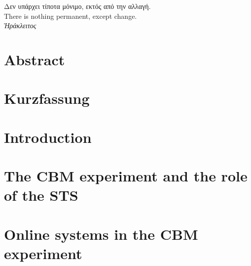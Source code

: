 \newcommand{\myNumberStyle}[1]{{\footnotesize\sffamily\color{brown!100!black} #1}}











\thispagestyle{empty}
\begin{center}

\hspace{0pt}
\vfill

\Large\foreignlanguage{greek}{Δεν υπάρχει τίποτα μόνιμο, εκτός από την αλλαγή.\\}
\vspace{0.5cm}
\normalsize{There is nothing permanent, except change.\\}
\vspace{1cm}
\color{auburn}\foreignlanguage{greek}{\textit{Ἡράκλειτος}}
\vfill
\hspace{0pt}
\end{center}
\chapter*{Abstract}
\chapter*{Kurzfassung}
%
\chapter{Introduction}
\label{chap:intro}

\chapter{The CBM experiment and the role of the STS}
\label{chap:CBM_STS}



\chapter{Online systems in the CBM experiment}
\label{chap:online_systems}






